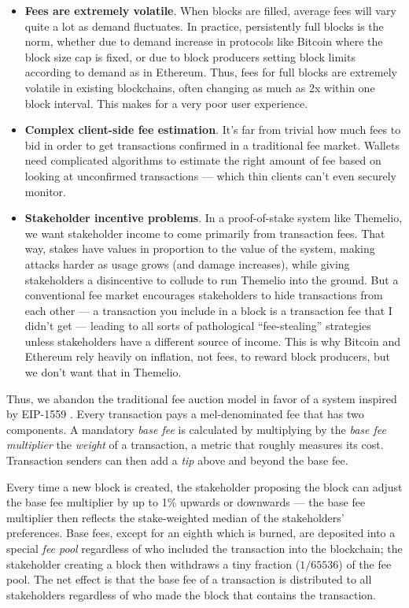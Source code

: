 \documentclass[headinclude,12pt]{scrbook}
\begin{document}
\begin{itemize}
    \item \textbf{Fees are extremely volatile}. When blocks are filled, average fees will vary quite a lot as demand fluctuates. In practice, persistently full blocks is the norm, whether due to demand increase in protocols like Bitcoin where the block size cap is fixed, or due to block producers setting block limits according to demand as in Ethereum. Thus, fees for full blocks are extremely volatile in existing blockchains, often changing as much as 2x within one block interval. This makes for a very poor user experience.
    \item \textbf{Complex client-side fee estimation}. It's far from trivial how much fees to bid in order to get transactions confirmed in a traditional fee market. Wallets need complicated algorithms to estimate the right amount of fee based on looking at unconfirmed transactions --- which thin clients can't even securely monitor.
    \item \textbf{Stakeholder incentive problems}. In a proof-of-stake system like Themelio, we want stakeholder income to come primarily from transaction fees. That way, stakes have values in proportion to the value of the system, making attacks harder as usage grows (and damage increases), while giving stakeholders a disincentive to collude to run Themelio into the ground. But a conventional fee market encourages stakeholders to hide transactions from each other --- a transaction you include in a block is a transaction fee that I didn't get --- leading to all sorts of pathological ``fee-stealing'' strategies unless stakeholders have a different source of income. This is why Bitcoin and Ethereum rely heavily on inflation, not fees, to reward block producers, but we don't want that in Themelio.
\end{itemize}

Thus, we abandon the traditional fee auction model in favor of a system inspired by EIP-1559 \cite{eip1559}. Every transaction pays a mel-denominated fee that has two components. A mandatory \textit{base fee} is calculated by multiplying by the \textit{base fee multiplier} the \textit{weight} of a transaction, a metric that roughly measures its cost. Transaction senders can then add a \textit{tip} above and beyond the base fee.

Every time a new block is created, the stakeholder proposing the block can adjust the base fee multiplier by up to 1\% upwards or downwards --- the base fee multiplier then reflects the stake-weighted median of the stakeholders' preferences. Base fees, except for an eighth which is burned, are deposited into a special \textit{fee pool} regardless of who included the transaction into the blockchain; the stakeholder creating a block then withdraws a tiny fraction ($1/65536$) of the fee pool. The net effect is that the base fee of a transaction is distributed to all stakeholders regardless of who made the block that contains the transaction.
\end{document}
